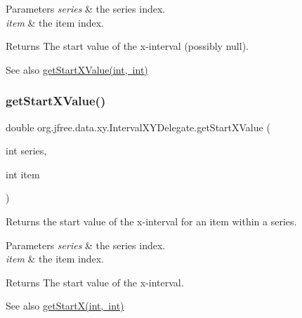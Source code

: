 \begin{DoxyParams}{Parameters}
{\em series} & the series index. \\
\hline
{\em item} & the item index.\\
\hline
\end{DoxyParams}
\begin{DoxyReturn}{Returns}
The start value of the x-\/interval (possibly {\ttfamily null}).
\end{DoxyReturn}
\begin{DoxySeeAlso}{See also}
\mbox{\hyperlink{classorg_1_1jfree_1_1data_1_1xy_1_1_interval_x_y_delegate_aca11528343565c13c21ab6501e48a0c7}{get\+Start\+X\+Value(int, int)}} 
\end{DoxySeeAlso}
\mbox{\label{classorg_1_1jfree_1_1data_1_1xy_1_1_interval_x_y_delegate_aca11528343565c13c21ab6501e48a0c7}} 
\subsubsection{\texorpdfstring{get\+Start\+X\+Value()}{getStartXValue()}}
{\footnotesize\ttfamily double org.\+jfree.\+data.\+xy.\+Interval\+X\+Y\+Delegate.\+get\+Start\+X\+Value (\begin{DoxyParamCaption}\item[{int}]{series,  }\item[{int}]{item }\end{DoxyParamCaption})}

Returns the start value of the x-\/interval for an item within a series.


\begin{DoxyParams}{Parameters}
{\em series} & the series index. \\
\hline
{\em item} & the item index.\\
\hline
\end{DoxyParams}
\begin{DoxyReturn}{Returns}
The start value of the x-\/interval.
\end{DoxyReturn}
\begin{DoxySeeAlso}{See also}
\mbox{\hyperlink{classorg_1_1jfree_1_1data_1_1xy_1_1_interval_x_y_delegate_a2589d4e95e8ddaa401af12826572982d}{get\+Start\+X(int, int)}} 
\end{DoxySeeAlso}
\mbox{\label{classorg_1_1jfree_1_1data_1_1xy_1_1_interval_x_y_delegate_a0ea3d7126d100e94c1975b9fca43ebc4}} 
